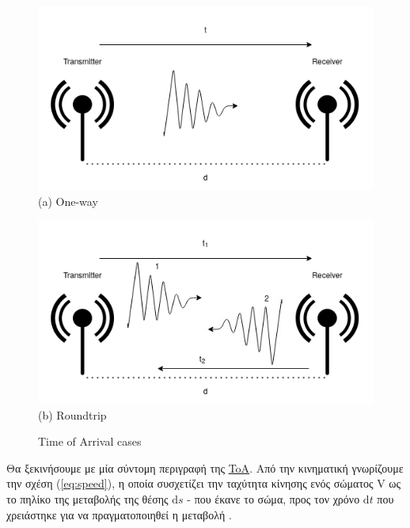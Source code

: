 \begin{figure} [H]
    \centering
    \begin{minipage}{.5\textwidth}
      \centering
      \includegraphics[width=\linewidth]{../Photos/toa-oneway.png}
      {(a) One-way}
    \end{minipage}%
    \begin{minipage}{.5\textwidth}
      \centering
      \includegraphics[width=\linewidth]{../Photos/toa-roundtrip.png}
      {(b) Roundtrip}
    \end{minipage}
    \hfill \break
    \decoRule
    \caption[Time of Arrival cases]{Time of Arrival cases}
    \label{fig:Time-of-Arrival-cases}
\end{figure}

Θα ξεκινήσουμε με μία σύντομη περιγραφή της \hyperref[abbr:ToA]{ToA}. Από την κινηματική γνωρίζουμε την 
σχέση (\ref{eq:speed}), η οποία συσχετίζει την ταχύτητα κίνησης ενός σώματος V ως το πηλίκο της μεταβολής
της θέσης $\mathrm{d}s$ - που έκανε το σώμα, προς τον χρόνο $\mathrm{d}t$ που χρειάστηκε για να πραγματοποιηθεί η μεταβολή \cite{Kinematics}.

